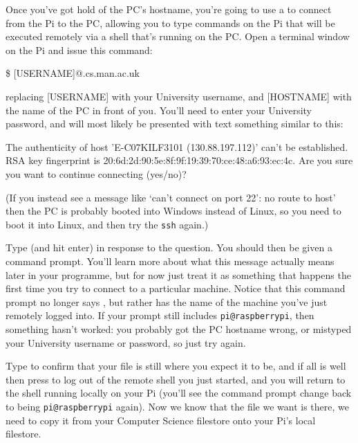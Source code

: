 Once you've got hold of the PC's hostname, you're going to use a
 to connect from the Pi to the
PC, allowing you to type commands on the Pi that will be executed
remotely via a shell that's running on the PC. Open a terminal window
on the Pi and issue this command:

\begin{ttoutenv}
\$  [USERNAME]\!@\![HOSTNAME].cs.man.ac.uk
\end{ttoutenv}

replacing [USERNAME] with your University username, and [HOSTNAME]
with the name of the PC in front of you. You'll need to enter your
University password, and will most likely be presented with text
something similar to this:

\begin{ttoutenv}
The authenticity of host 'E-C07KILF3101 (130.88.197.112)' can't be
established.
RSA key fingerprint is 20:6d:2d:90:5e:8f:9f:19:39:70:ce:48:a6:93:ec:4c.
Are you sure you want to continue connecting (yes/no)?
\end{ttoutenv}

(If you instead see a message like `can't connect on port 22': no
route to host' then the PC is probably booted into Windows instead of Linux,
so you need to boot it into Linux, and then try the \verb+ssh+ again.)

Type  (and hit enter) in response to the question. You
should then be given a command prompt. You'll learn more about what
this message actually means later in your programme, but for now just
treat it as something that happens the first time you try to connect
to a particular machine. Notice that this command prompt no longer
says , but rather has the name of the machine
you've just remotely logged into. If your prompt still includes
\texttt{pi@raspberrypi}, then something hasn't worked: you probably
got the PC hostname wrong, or mistyped your University username or
password, so just try again.

Type  to confirm that your  file is
still where you expect it to be, and if all is well then press
 to log out of the remote shell you just started, and you will
return to the shell running locally on your Pi (you'll see the command
prompt change back to being \texttt{pi@raspberrypi} again). Now we
know that the file we want is there, we need to copy it from your
Computer Science filestore onto your Pi's local filestore.

